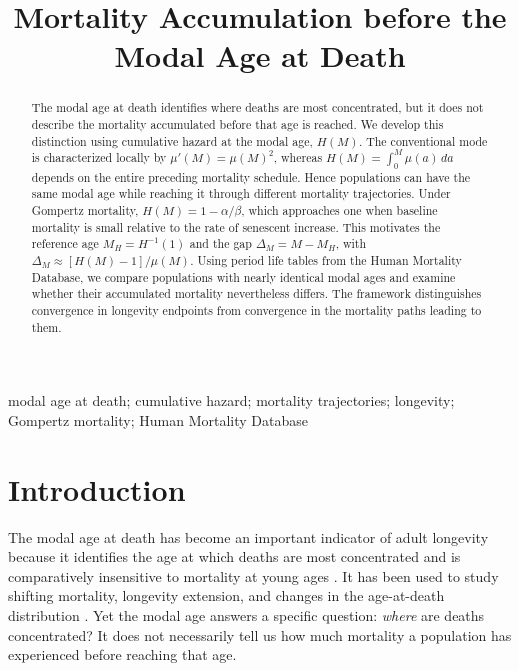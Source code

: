 \documentclass[doublespace]{interact}
\begin{document}
\title{Mortality Accumulation before the Modal Age at Death}
\date{}
\maketitle

\begin{abstract}
The modal age at death identifies where deaths are most concentrated, but it does not describe the mortality accumulated before that age is reached. We develop this distinction using cumulative hazard at the modal age, $H(M)$. The conventional mode is characterized locally by $\mu'(M)=\mu(M)^2$, whereas $H(M)=\int_0^M\mu(a)\,da$ depends on the entire preceding mortality schedule. Hence populations can have the same modal age while reaching it through different mortality trajectories. Under Gompertz mortality, $H(M)=1-\alpha/\beta$, which approaches one when baseline mortality is small relative to the rate of senescent increase. This motivates the reference age $M_H=H^{-1}(1)$ and the gap $\Delta_M=M-M_H$, with $\Delta_M\approx[H(M)-1]/\mu(M)$. Using period life tables from the Human Mortality Database, we compare populations with nearly identical modal ages and examine whether their accumulated mortality nevertheless differs. The framework distinguishes convergence in longevity endpoints from convergence in the mortality paths leading to them.
\end{abstract}

\begin{keywords}
modal age at death; cumulative hazard; mortality trajectories; longevity; Gompertz mortality; Human Mortality Database
\end{keywords}

\section{Introduction}

The modal age at death has become an important indicator of adult longevity because it identifies the age at which deaths are most concentrated and is comparatively insensitive to mortality at young ages \citep{Kannisto2001,CanudasRomo2008,HoriuchiEtAl2013}. It has been used to study shifting mortality, longevity extension, and changes in the age-at-death distribution \citep{CheungEtAl2005,CheungRobine2007,CanudasRomo2010}. Yet the modal age answers a specific question: \emph{where} are deaths concentrated? It does not necessarily tell us how much mortality a population has experienced before reaching that age.
\end{document}

